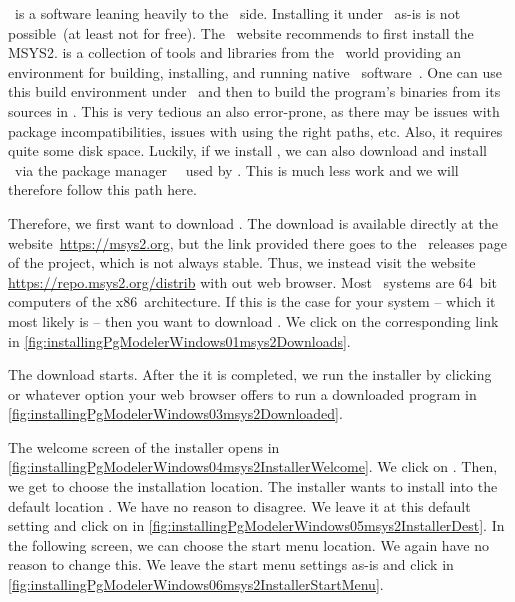 %
\pgmodeler\ is a software leaning heavily to the \linux\ side.
Installing it under \microsoftWindows\ as-is is not possible~(at least not for free).
The \pgmodeler\ website recommends to first install the \gls{MSYS2}.
 is a collection of tools and libraries from the \linux\ world providing an environment for building, installing, and running native \microsoftWindows\ software~\cite{TO2024BCCAIGTMCCAMC:MS}.
One can use this build environment under \microsoftWindows\ and then to build the program's binaries from its sources in .
This is very tedious an also error-prone, as there may be issues with package incompatibilities, issues with using the right paths, etc.
Also, it requires quite some disk space.
Luckily, if we install , we can also download and install \pgmodeler\ via the package manager~~\cite{VGL2002:P,TOSID2025L:COMPMS} used by .
This is much less work and we will therefore follow this path here.

Therefore, we first want to download .
The download is available directly at the website~\url{https://msys2.org}, but the link provided there goes to the \github\ releases page of the project, which is not always stable.
Thus, we instead visit the website \url{https://repo.msys2.org/distrib} with out web browser.
Most \microsoftWindows\ systems are 64~bit computers of the x86~architecture.
If this is the case for your system -- which it most likely is -- then you want to download .
We click on the corresponding link in \cref{fig:installingPgModelerWindows01msys2Downloads}.

The download starts.
After the it is completed, we run the installer by clicking~ or whatever option your web browser offers to run a downloaded program in \cref{fig:installingPgModelerWindows03msys2Downloaded}.

The welcome screen of the installer opens in \cref{fig:installingPgModelerWindows04msys2InstallerWelcome}.
We click on .
Then, we get to choose the installation location.
The installer wants to install  into the default location \expandafter{}.
We have no reason to disagree.
We leave it at this default setting and click on  in \cref{fig:installingPgModelerWindows05msys2InstallerDest}.
In the following screen, we can choose the start menu location.
We again have no reason to change this.
We leave the start menu settings as-is and click  in \cref{fig:installingPgModelerWindows06msys2InstallerStartMenu}.

